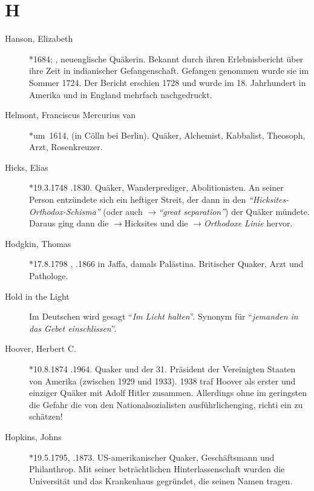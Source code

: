 \section*{H}

\articlesize

\begin{description}

 \item[Hanson, Elizabeth] $\ast$1684; , neuenglische Quäkerin. Bekannt
 durch ihren Erlebnisbericht über ihre Zeit in indianischer Gefangenschaft.
 Gefangen genommen wurde sie im Sommer 1724. Der Bericht erschien 1728 und
 wurde im 18. Jahrhundert in Amerika und in England mehrfach nachgedruckt.

 \item[Helmont, Franciscus Mercurius van] $\ast$um~1614,  (in Cölln
 bei Berlin). Quäker, Alchemist, Kabbalist, Theosoph, Arzt, Rosenkreuzer.

 \item[Hicks, Elias] $\ast$19.3.1748 .1830. Quäker, Wanderprediger,
 Abolitionisten. An seiner Person entzündete sich ein heftiger Streit, der
 dann in den  \textit{"`Hicksites-Orthodox-Schisma"'} (oder auch
 $\to$\textit{"`great separation"'}) der Quäker mündete.
 Daraus ging dann die $\to$Hicksites und die $\to$\textit{Orthodoxe Linie} hervor.


 
 \item[Hodgkin, Thomas] $\ast$17.8.1798 , .1866 in Jaffa, damals
 Palästina. Britischer Quaker, Arzt und Pathologe.

\item[Hold in the Light] Im Deutschen wird gesagt "`\textit{Im Licht halten}"'.
Synonym für "`\textit{jemanden in das Gebet einschlissen}"'.

 \item[Hoover, Herbert C.] $\ast$10.8.1874 .1964. Quaker und der 31.
 Präsident der Vereinigten Staaten von Amerika (zwischen 1929 und 1933). 1938
 traf Hoover als erster und einziger Quäker mit Adolf Hitler zusammen.
 Allerdings ohne im geringsten die Gefahr die von den Nationalsozialisten
 ausführlichenging, richti ein zu schätzen!

 \item[Hopkins, Johns] $\ast$19.5.1795, .1873. US-amerikanischer Quaker,
 Geschäftsmann und Philanthrop. Mit seiner beträchtlichen Hinterlassenschaft
 wurden die Universität und das Krankenhaus gegründet, die seinen Namen tragen.


\end{description}
